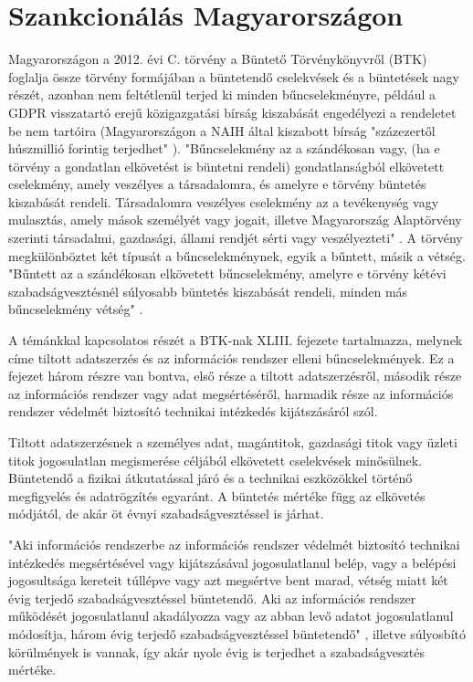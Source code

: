 \section{Szankcionálás Magyarországon}

Magyarországon a 2012. évi C. törvény a Büntető Törvénykönyvről (BTK) \cite{2012-C-torveny} foglalja össze törvény formájában a büntetendő cselekvések és a büntetések nagy részét, azonban nem feltétlenül terjed ki minden bűncselekményre, például a GDPR visszatartó erejű közigazgatási bírság kiszabását engedélyezi a rendeletet be nem tartóira (Magyarországon a NAIH által kiszabott bírság "százezertől húszmillió forintig terjedhet" \cite{2011-CXII-torveny}). "Bűncselekmény az a szándékosan vagy, (ha e törvény a gondatlan elkövetést is büntetni rendeli) gondatlanságból elkövetett cselekmény, amely veszélyes a társadalomra, és amelyre e törvény büntetés kiszabását rendeli. Társadalomra veszélyes cselekmény az a tevékenység vagy mulasztás, amely mások személyét vagy jogait, illetve Magyarország Alaptörvény szerinti társadalmi, gazdasági, állami rendjét sérti vagy veszélyezteti" \cite{2012-C-torveny}. A törvény megkülönböztet két típusát a bűncselekménynek, egyik a bűntett, másik a vétség. "Bűntett az a szándékosan elkövetett bűncselekmény, amelyre e törvény kétévi szabadságvesztésnél súlyosabb büntetés kiszabását rendeli, minden más bűncselekmény vétség" \cite{2012-C-torveny}.

A témánkkal kapcsolatos részét a BTK-nak XLIII. fejezete tartalmazza, melynek címe tiltott adatszerzés és az információs rendszer elleni bűncselekmények. Ez a fejezet három részre van bontva, első része a tiltott adatszerzésről, második része az információs rendszer vagy adat megsértéséről, harmadik része az információs rendszer védelmét biztosító technikai intézkedés kijátszásáról szól.

Tiltott adatszerzésnek a személyes adat, magántitok, gazdasági titok vagy üzleti titok jogosulatlan megismerése céljából elkövetett cselekvések minősülnek. Büntetendő a fizikai átkutatással járó és a technikai eszközökkel történő megfigyelés és adatrögzítés egyaránt. A büntetés mértéke függ az elkövetés módjától, de akár öt évnyi szabadságvesztéssel is járhat.

"Aki információs rendszerbe az információs rendszer védelmét biztosító technikai intézkedés megsértésével vagy kijátszásával jogosulatlanul belép, vagy a belépési jogosultsága kereteit túllépve vagy azt megsértve bent marad, vétség miatt két évig terjedő szabadságvesztéssel büntetendő. Aki az információs rendszer működését jogosulatlanul akadályozza vagy az abban levő adatot jogosulatlanul módosítja, három évig terjedő szabadságvesztéssel büntetendő" \cite{2012-C-torveny}, illetve súlyosbító körülmények is vannak, így akár nyolc évig is terjedhet a szabadságvesztés mértéke.

